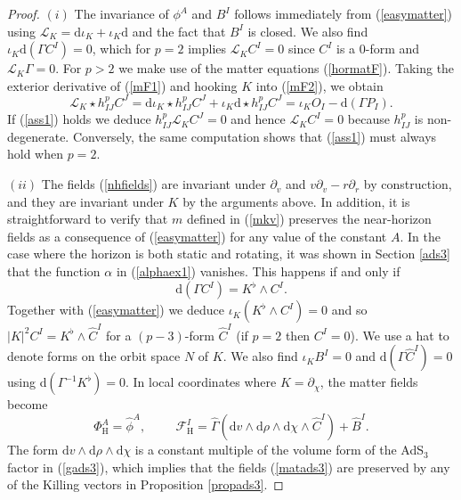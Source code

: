 \documentclass[11pt, reqno]{amsart}
\theoremstyle{plain}
\theoremstyle{definition}
\numberwithin{equation}{section}
\begin{document}
\begin{proof}
    $(i)$ The invariance of $\phi^A$ and $B^I$ follows immediately from (\ref{easymatter}) using $\mathcal{L}_K = \text{d}\iota_K + \iota_K\text{d}$ and the fact that $B^I$ is closed. We also find $\iota_K\text{d}(\Gamma C^I) = 0$, which for $p = 2$ implies $\mathcal{L}_K C^I = 0$ since $C^I$ is a $0$-form and $\mathcal{L}_K\Gamma = 0$. For $p > 2$ we make use of the matter equations (\ref{hormatF}). Taking the exterior derivative of (\ref{mF1}) and hooking $K$ into (\ref{mF2}), we obtain
    \begin{equation*}
        \mathcal{L}_K\star h^p_{IJ}C^J =  \text{d}\iota_K\star h^p_{IJ}C^J + \iota_K\text{d}\star h^p_{IJ}C^J  = \iota_K O_I-\text{d}(\Gamma P_I).
    \end{equation*}
    If (\ref{ass1}) holds we deduce $h^p_{IJ}\mathcal{L}_KC^J = 0$ and hence $\mathcal{L}_K C^I = 0$ because $h^p_{IJ}$ is non-degenerate. Conversely, the same computation shows that (\ref{ass1}) must always hold when $p = 2$.

    $(ii)$ The fields (\ref{nhfields}) are invariant under $\partial_v$ and $v\partial_v - r\partial_r$ by construction, and they are invariant under $K$ by the arguments above. In addition, it is straightforward to verify that $m$ defined in (\ref{mkv}) preserves the near-horizon fields as a consequence of (\ref{easymatter}) for any value of the constant $A$. In the case where the horizon is both static and rotating, it was shown in Section \ref{ads3} that the function $\alpha$ in (\ref{alphaex1}) vanishes. This happens if and only if
\begin{equation*}
    \text{d}(\Gamma C^I) = K^\flat \wedge C^I.
\end{equation*}
Together with (\ref{easymatter}) we deduce $\iota_K (K^\flat \wedge C^I) = 0$ and so $\vert K \vert^2 C^I = K^\flat \wedge \hat{C}^I$ for a $(p-3)$-form $\hat{C}^I$ (if $p = 2$ then $C^I = 0$). We use a hat to denote forms on the orbit space $N$ of $K$. We also find $\iota_K B^I = 0$ and $\text{d}(\Gamma \hat{C}^I) = 0$ using d$(\Gamma^{-1}K^\flat) = 0$. In local coordinates where $K = \partial_{\chi}$, the matter fields become
\begin{equation} \label{matads3}
    \Phi^A_{\text{H}} = \hat{\phi}^A, \hspace{1cm}\mathcal{F}_{\text{H}}^I = \hat{\Gamma}(\text{d}v\wedge \text{d}\rho \wedge\text{d}\chi \wedge \hat{C}^I) + \hat{B}^I.
\end{equation}
The form $\text{d}v \wedge \text{d}\rho\wedge \text{d}\chi$ is a constant multiple of the volume form of the AdS$_3$ factor in (\ref{gads3}), which implies that the fields (\ref{matads3}) are preserved by any of the Killing vectors in Proposition \ref{propads3}.
\end{proof} 
\end{document}
